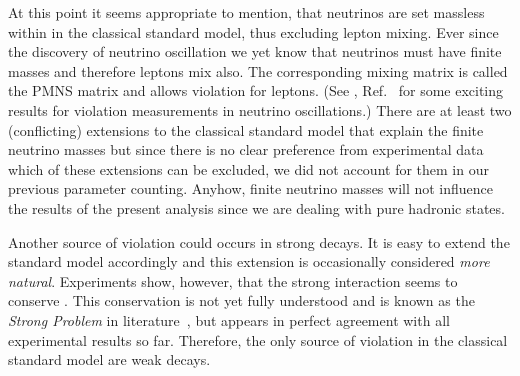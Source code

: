 At this point it seems appropriate to mention, that neutrinos are set massless within in the classical standard model, thus excluding lepton mixing.
Ever since the discovery of neutrino oscillation \cite{Fukuda1998,Ahmad2001,Ahmad2002} we yet know that neutrinos must have finite masses and therefore leptons mix also.
The corresponding mixing matrix is called the PMNS matrix \cite{Maki1962} and allows \CP violation for leptons. (See \eg{}, Ref.~\cite{nucpv} for some exciting results for \CP violation measurements in neutrino oscillations.) 
There are at least two (conflicting) extensions to the classical standard model that explain the finite neutrino masses but since there is no clear preference from experimental data which of these extensions can be excluded, we did not account for them in our previous parameter counting.
Anyhow, finite neutrino masses will not influence the results of the present analysis since we are dealing with pure hadronic states.

Another source of \CP violation could occurs in strong decays.
It is easy to extend the standard model accordingly and this extension is occasionally considered \textit{more natural}.
Experiments show, however, that the strong interaction seems to conserve \CP.
This conservation is not yet fully understood and is known as the \textit{Strong \CP Problem} in literature~\cite{Ciuchini2011,Mannel2007,LHCb_strongCP}, but appears in perfect agreement with all experimental results so far.
Therefore, the only source of \CP violation in the classical standard model are weak decays.



